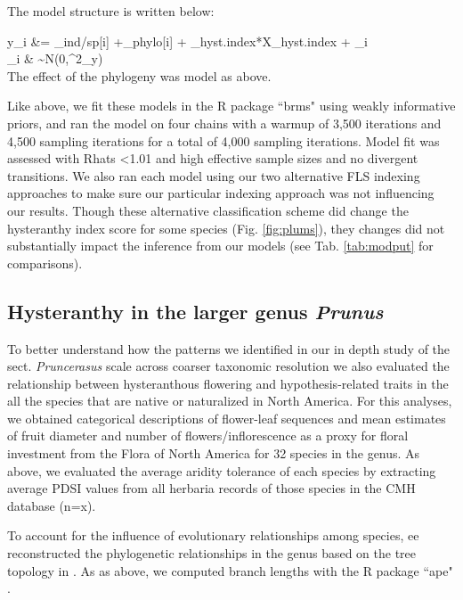 \documentclass{article}[11pt]
\begin{document}
The model structure is written below: 

  y_i &= \alpha_{ind/sp[i]} +\alpha_{phylo[i]} + \beta_{hyst.index}*X_{hyst.index} + \epsilon_i\\
  
  \epsilon_i & \sim N(0,\sigma^2_y) \\ %
  
  \noindent The effect of the phylogeny was model as above.%
  
Like above, we fit these models in the R package ``brms" \citep{Burkner2018} using weakly informative priors, and ran the model on four chains with a warmup of 3,500 iterations and 4,500 sampling iterations for a total of 4,000 sampling iterations. Model fit was assessed with Rhats <1.01 and high effective sample sizes and no divergent transitions. We also ran each model using our two alternative FLS indexing approaches to make sure our particular indexing approach was not influencing our results. Though these alternative classification scheme did change the hysteranthy index score for some species (Fig. \ref{fig:plums}), they changes did not substantially impact the inference from our models (see Tab. \ref{tab:modput} for comparisons).

\subsection*{Hysteranthy in the larger genus \textit{Prunus}}

To better understand how the patterns we identified in our in depth study of the sect. \textit{Pruncerasus} scale across coarser taxonomic resolution we also evaluated the relationship between hysteranthous flowering and hypothesis-related traits in the all the  species that are native or naturalized in North America. For this analyses, we obtained categorical descriptions of flower-leaf sequences and mean estimates of fruit diameter and number of flowers/inflorescence as a proxy for floral investment from the Flora of North America \citep{} for 32 species in the genus. As above, we evaluated the average aridity tolerance of each species by extracting average PDSI values from all herbaria records of those species in the CMH database (n=x). 
 
To account for the influence of evolutionary relationships among species, ee reconstructed the phylogenetic relationships in the genus based on the tree topology in \citet{}. As as above, we computed branch lengths with the R package ``ape" \citep{}. 
\end{document}
